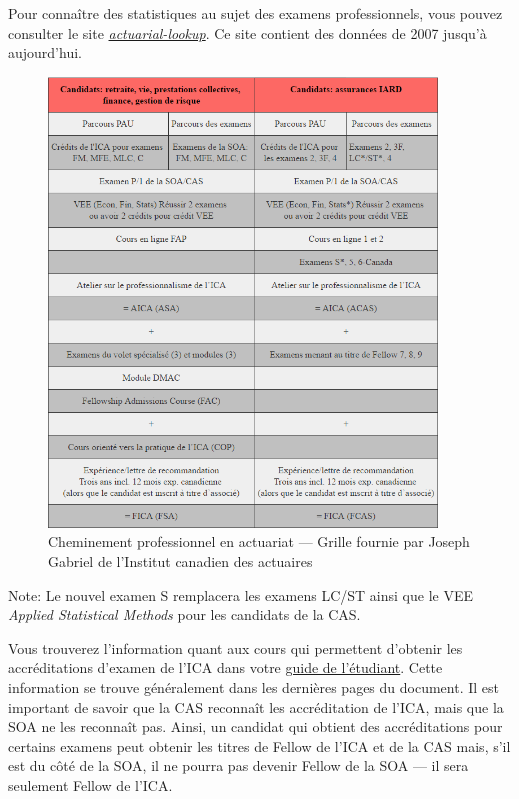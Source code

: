 \documentclass[11pt,french]{article}
\begin{document}
Pour connaître des statistiques au sujet des examens professionnels, vous pouvez consulter le site \href{http://actuarial-lookup.com/}{\emph{actuarial-lookup}}. Ce site contient des données de 2007 jusqu'à aujourd'hui.

\begin{center}
\begin{figure}[hp]
\includegraphics[width=0.92\textwidth]{tableau_ICA}
\caption{Cheminement professionnel en actuariat --- Grille fournie par Joseph Gabriel de l'Institut canadien des actuaires}
\end{figure}
\par
\end{center}

Note: Le nouvel examen S remplacera les examens LC/ST ainsi que le VEE \emph{Applied Statistical Methods} pour les candidats de la CAS.\vspace{\baselineskip}

Vous trouverez l'information quant aux cours qui permettent d'obtenir les accréditations d'examen de l'ICA dans votre \href{https://www.act.ulaval.ca/programmes-et-cours/premier-cycle/guide-de-letudiant/}{guide de l'étudiant}. Cette information se trouve généralement dans les dernières pages du document. Il est important de savoir que la CAS reconnaît les accréditation de l'ICA, mais que la SOA ne les reconnaît pas. Ainsi, un candidat qui obtient des accréditations pour certains examens peut obtenir les titres de Fellow de l'ICA et de la CAS mais, s'il est du côté de la SOA, il ne pourra pas devenir Fellow de la SOA --- il sera seulement Fellow de l'ICA.
\end{document}
